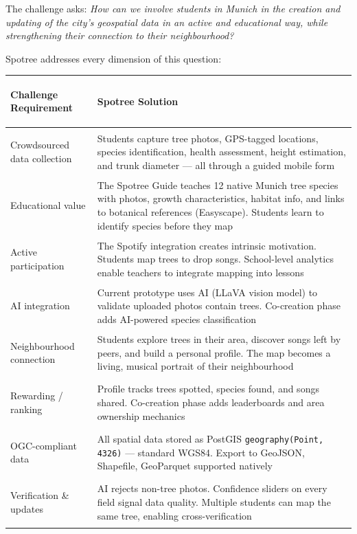 \documentclass[11pt,a4paper]{article}
\newcommand{\proposalTableStart}{\arrayrulecolor{black}}
\newcommand{\proposalTableHeader}{}
\newcommand{\proposalTableEnd}{\arrayrulecolor{black}}
\begin{document}
The challenge asks: \textit{How can we involve students in Munich in the creation and updating of the city's geospatial data in an active and educational way, while strengthening their connection to their neighbourhood?}

Spotree addresses every dimension of this question:

\begin{center}
\small
\proposalTableStart
\begin{tabularx}{\textwidth}{|>{\bfseries\raggedright\arraybackslash}p{}|Y|}
\hline
\proposalTableHeader
\textbf{Challenge Requirement} & \textbf{Spotree Solution} \\
\hline
Crowdsourced data collection & Students capture tree photos, GPS-tagged locations, species identification, health assessment, height estimation, and trunk diameter --- all through a guided mobile form \\
\hline
Educational value & The Spotree Guide teaches 12 native Munich tree species with photos, growth characteristics, habitat info, and links to botanical references (Easyscape). Students learn to identify species before they map \\
\hline
Active participation & The Spotify integration creates intrinsic motivation. Students map trees to drop songs. School-level analytics enable teachers to integrate mapping into lessons \\
\hline
AI integration & Current prototype uses AI (LLaVA vision model) to validate uploaded photos contain trees. Co-creation phase adds AI-powered species classification \\
\hline
Neighbourhood connection & Students explore trees in their area, discover songs left by peers, and build a personal profile. The map becomes a living, musical portrait of their neighbourhood \\
\hline
Rewarding / ranking & Profile tracks trees spotted, species found, and songs shared. Co-creation phase adds leaderboards and area ownership mechanics \\
\hline
OGC-compliant data & All spatial data stored as PostGIS \texttt{geography(Point, 4326)} --- standard WGS84. Export to GeoJSON, Shapefile, GeoParquet supported natively \\
\hline
Verification \& updates & AI rejects non-tree photos. Confidence sliders on every field signal data quality. Multiple students can map the same tree, enabling cross-verification \\
\hline
\end{tabularx}
\proposalTableEnd
\end{center}
\end{document}
